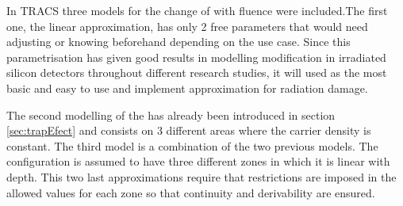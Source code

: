 


In TRACS three models for the change of \neff with fluence were included.The first one, the linear approximation, has only 2 free parameters that would need adjusting or knowing beforehand depending on the use case. Since this parametrisation has given good results in modelling \neff modification in irradiated silicon detectors throughout different research studies, it will used as the most basic and easy to use and implement approximation for radiation damage.

The second modelling of the \neff  has already been introduced in section \ref{sec:trapEfect} and consists on 3 different areas where the carrier density is constant. 
The third model is a combination of the two previous models. The \neff configuration is assumed to have three different zones in which it is linear with depth. This two last approximations require that restrictions are imposed in the allowed values for each zone so that continuity and derivability are ensured.

